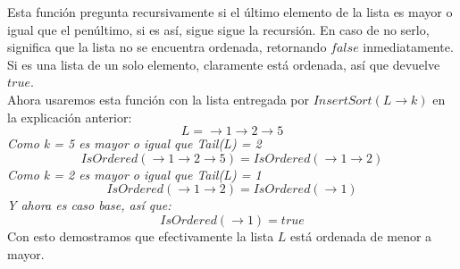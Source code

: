 \documentclass[../doc.tex]{subfiles}
\begin{document}
Esta función pregunta recursivamente si el último elemento de la lista es mayor o igual que el penúltimo, si es así, sigue sigue la recursión. En caso de no serlo, significa que la lista no se encuentra ordenada, retornando $false$ inmediatamente.\\
Si es una lista de un solo elemento, claramente está ordenada, así que devuelve $true$.\\

Ahora usaremos esta función con la lista entregada por $InsertSort(L \rightarrow k)$ en la explicación anterior:
\[L = \rightarrow 1 \rightarrow 2 \rightarrow 5\]
\emph{Como k = 5 es mayor o igual que Tail(L) = 2}
\[IsOrdered(\rightarrow 1 \rightarrow 2 \rightarrow 5) = IsOrdered(\rightarrow 1 \rightarrow 2)\]
\emph{Como k = 2 es mayor o igual que Tail(L) = 1}
\[IsOrdered(\rightarrow 1 \rightarrow 2) = IsOrdered(\rightarrow 1)\]
\emph{Y ahora es caso base, así que: }
\[IsOrdered(\rightarrow 1) = true\]
Con esto demostramos que efectivamente la lista $L$ está ordenada de menor a mayor. 
\end{document}
